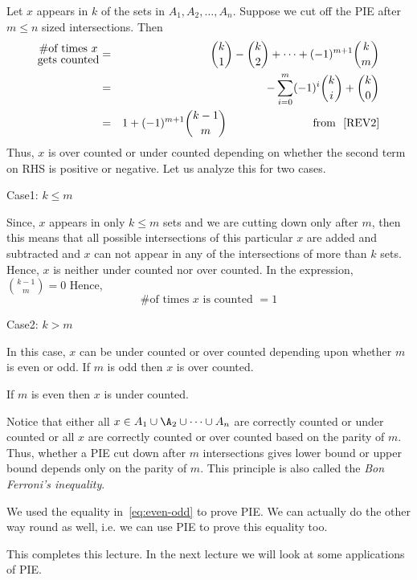 Let $x$ appears in $k$ of the sets in $A_1, A_2, \ldots, A_n$. Suppose we cut off the PIE after $m\le n$ sized intersections. Then 
\begin{eqnarray*} 
{\Large\substack{\# \text{of times $x$}\\ \text{gets counted}}} &=& {k\choose 1}-{k\choose 2}+\cdots+(-1)^{m+1}{k\choose m}\\
&=&-\sum_{i=0}^m(-1)^{i}{k\choose i}+{k\choose 0}\\
&=& 1+(-1)^{m+1}{k-1\choose m} ~~~~~~~~~~~~~~~~~~~~~~~\text{from ~\eqref{REV2}}
\end{eqnarray*}
Thus, $x$ is over counted or under counted depending on whether the second term on RHS is positive or negative. Let us analyze this for two cases.
\begin{description}
\item Case1: $k\le m$

Since, $x$ appears in only $k\le m$ sets and we are cutting down only after $m$, then this means that all possible intersections of this particular $x$ are added and subtracted and $x$ can not appear in any of the intersections of more than $k$ sets. Hence, $x$ is neither under counted nor over counted. In the expression, ${k-1\choose m} = 0$ Hence,
$$\# \text{of times $x$ is counted } = 1$$
\item Case2: $k>m$

In this case, $x$ can be under counted or over counted depending upon whether $m$ is even or odd.
If $m$ is odd then $x$ is over counted.

If $m$ is even then $x$ is under counted.
\end{description}
Notice that either all $x\in A_1\cup\A_2\cup\cdots\cup A_n$ are correctly counted or under counted or all $x$ are correctly counted or over counted based on the parity of $m$. Thus, whether a PIE cut down after $m$ intersections gives lower bound or upper bound depends only on the parity of $m$. This principle is also called the \emph{Bon Ferroni's inequality}. 
\begin{remark} 
    We used the equality in~\eqref{eq:even-odd} to prove PIE. We can actually do the other way round as well, i.e. we can use PIE to prove this equality too.
\end{remark}
This completes this lecture. In the next lecture we will look at some applications of PIE.
